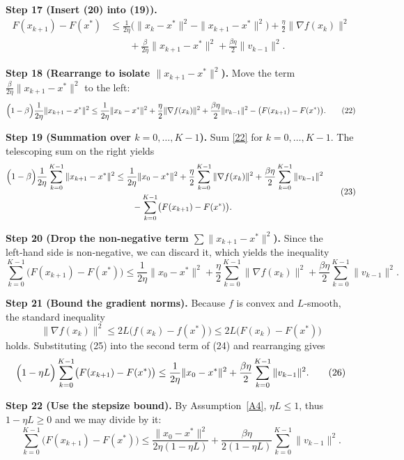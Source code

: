 \documentclass{article}
\begin{document}
\noindent\textbf{Step 17 (Insert (20) into (19)).}  
\[
\begin{aligned}
F(x_{k+1})-F(x^{*})
&\le
\frac{1}{2\eta}\bigl(\|x_{k}-x^{*}\|^{2}-\|x_{k+1}-x^{*}\|^{2}\bigr)
+\frac{\eta}{2}\|\nabla f(x_{k})\|^{2}\\
&\qquad
+\frac{\beta}{2\eta}\|x_{k+1}-x^{*}\|^{2}
+\frac{\beta\eta}{2}\|v_{k-1}\|^{2}.
\end{aligned}
\tag{21}
\]

\noindent\textbf{Step 18 (Rearrange to isolate $\|x_{k+1}-x^{*}\|^{2}$).}  
Move the term $\frac{\beta}{2\eta}\|x_{k+1}-x^{*}\|^{2}$ to the left:
\[
\Bigl(1-\beta\Bigr)\frac{1}{2\eta}\|x_{k+1}-x^{*}\|^{2}
\le
\frac{1}{2\eta}\|x_{k}-x^{*}\|^{2}
+\frac{\eta}{2}\|\nabla f(x_{k})\|^{2}
+\frac{\beta\eta}{2}\|v_{k-1}\|^{2}
-\bigl(F(x_{k+1})-F(x^{*})\bigr).
\tag{22}
\]

\noindent\textbf{Step 19 (Summation over $k=0,\dots,K-1$).}  
Sum \eqref{22} for $k=0,\dots,K-1$. The telescoping sum on the right yields
\[
\begin{aligned}
\Bigl(1-\beta\Bigr)\frac{1}{2\eta}\sum_{k=0}^{K-1}\|x_{k+1}-x^{*}\|^{2}
&\le
\frac{1}{2\eta}\|x_{0}-x^{*}\|^{2}
+\frac{\eta}{2}\sum_{k=0}^{K-1}\|\nabla f(x_{k})\|^{2}
+\frac{\beta\eta}{2}\sum_{k=0}^{K-1}\|v_{k-1}\|^{2}\\
&\qquad
-\sum_{k=0}^{K-1}\bigl(F(x_{k+1})-F(x^{*})\bigr).
\end{aligned}
\tag{23}
\]

\noindent\textbf{Step 20 (Drop the non‑negative term $\sum\|x_{k+1}-x^{*}\|^{2}$).}  
Since the left‑hand side is non‑negative, we can discard it, which yields the inequality
\[
\sum_{k=0}^{K-1}\bigl(F(x_{k+1})-F(x^{*})\bigr)
\le
\frac{1}{2\eta}\|x_{0}-x^{*}\|^{2}
+\frac{\eta}{2}\sum_{k=0}^{K-1}\|\nabla f(x_{k})\|^{2}
+\frac{\beta\eta}{2}\sum_{k=0}^{K-1}\|v_{k-1}\|^{2}.
\tag{24}
\]

\noindent\textbf{Step 21 (Bound the gradient norms).}  
Because $f$ is convex and $L$‑smooth, the standard inequality
\[
\|\nabla f(x_{k})\|^{2}\le 2L\bigl(f(x_{k})-f(x^{*})\bigr)\le 2L\bigl(F(x_{k})-F(x^{*})\bigr)
\tag{25}
\]
holds. Substituting (25) into the second term of (24) and rearranging gives
\[
\Bigl(1-\eta L\Bigr)\sum_{k=0}^{K-1}\bigl(F(x_{k+1})-F(x^{*})\bigr)
\le
\frac{1}{2\eta}\|x_{0}-x^{*}\|^{2}
+\frac{\beta\eta}{2}\sum_{k=0}^{K-1}\|v_{k-1}\|^{2}.
\tag{26}
\]

\noindent\textbf{Step 22 (Use the stepsize bound).}  
By Assumption~\ref{A4}, $\eta L\le 1$, thus $1-\eta L\ge 0$ and we may divide by it:
\[
\sum_{k=0}^{K-1}\bigl(F(x_{k+1})-F(x^{*})\bigr)
\le
\frac{\|x_{0}-x^{*}\|^{2}}{2\eta(1-\eta L)}
+\frac{\beta\eta}{2(1-\eta L)}\sum_{k=0}^{K-1}\|v_{k-1}\|^{2}.
\tag{27}
\]
\end{document}
